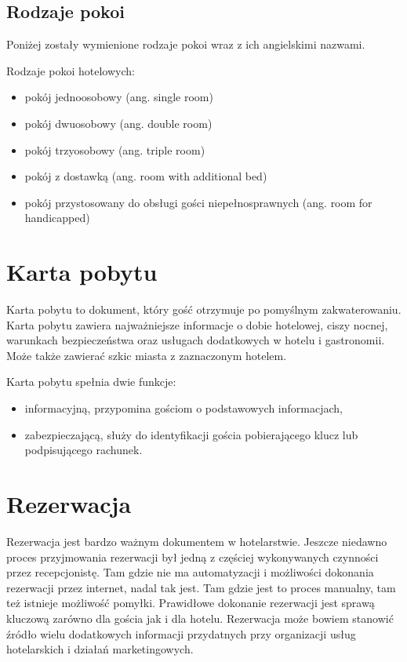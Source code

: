 \documentclass[a4paper,onecolumn,oneside,11pt,wide,floatssmall]{mwrep}
\theoremstyle{definition}
\theoremstyle{plain}%
\theoremstyle{remark}
\begin{document}
\subsection{Rodzaje pokoi}
Poniżej zostały wymienione rodzaje pokoi wraz z ich angielskimi nazwami.

Rodzaje pokoi hotelowych:
\begin{itemize}
  \item pokój jednoosobowy (ang. single room)
  \item pokój dwuosobowy (ang. double room)
  \item pokój trzyosobowy (ang. triple room)
  \item pokój z dostawką (ang. room with additional bed)
  \item pokój przystosowany do obsługi gości niepełnosprawnych (ang. room for 
  handicapped)
\end{itemize}

\section{Karta pobytu}
Karta pobytu to dokument, który gość otrzymuje po pomyślnym zakwaterowaniu. 
Karta pobytu zawiera najważniejsze informacje o dobie hotelowej, ciszy 
nocnej, warunkach bezpieczeństwa oraz usługach dodatkowych w hotelu i 
gastronomii. Może także zawierać szkic miasta z zaznaczonym hotelem.

Karta pobytu spełnia dwie funkcje:
\begin{itemize}
  \item{informacyjną}, przypomina gościom o podstawowych informacjach,
  \item{zabezpieczającą}, służy do identyfikacji gościa pobierającego klucz 
  lub podpisującego rachunek.
\end{itemize}

\section{Rezerwacja}
Rezerwacja jest bardzo ważnym dokumentem w hotelarstwie. Jeszcze niedawno 
proces przyjmowania rezerwacji był jedną z częściej wykonywanych czynności 
przez recepcjonistę. Tam gdzie nie ma automatyzacji i możliwości dokonania 
rezerwacji przez internet, nadal tak jest. Tam gdzie jest to proces manualny, 
tam też istnieje możliwość pomyłki. Prawidłowe dokonanie rezerwacji jest 
sprawą kluczową zarówno dla gościa jak i dla hotelu. Rezerwacja może bowiem 
stanowić źródło wielu dodatkowych informacji przydatnych przy organizacji 
usług hotelarskich i działań marketingowych.
\end{document}
